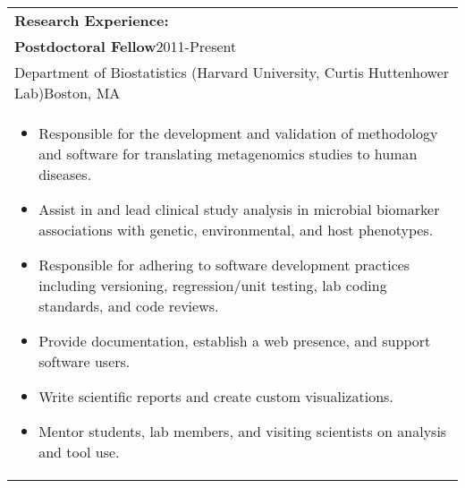 \documentclass[12pt]{report}
\def\fullLength{6.5in}
\begin{document}
\vspace{-12.0mm}

\section*{ }
\begin{spacing}{0.9}
\end{spacing}

\clearpage

\begin{table}[!ht]
\begin{tabular}{p{\fullLength}}
\textbf{\Large Research Experience:}\\
\textbf{Postdoctoral Fellow}\hfill 2011-Present\\
Department of Biostatistics (Harvard University, Curtis Huttenhower Lab)\hfill Boston, MA\\
\vspace{-7.0mm}
\begin{itemize}\addtolength{\itemsep}{-0.5\baselineskip}
\item Responsible for the development and validation of methodology and software for translating metagenomics studies to human diseases.
\item Assist in and lead clinical study analysis in microbial biomarker associations with genetic, environmental, and host phenotypes.
\item Responsible for adhering to software development practices including versioning, regression/unit testing, lab coding standards, and code reviews.
\item Provide documentation, establish a web presence, and support software users.
\item Write scientific reports and create custom visualizations.
\item Mentor students, lab members, and visiting scientists on analysis and tool use.
\end{itemize}
\end{tabular}
\end{table}

\vspace{-5.0mm}
\end{document}
